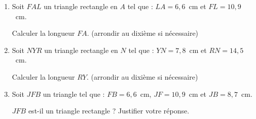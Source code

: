 \begin{minipage}{0.99\linewidth}

\exo


 

    \begin{enumerate}
    \item Soit $FAL$ un triangle rectangle en $A$ tel que :
    $LA=6,6$~cm et $FL=10,9$~cm.\par
      Calculer la longueur $FA$. (arrondir au dixième si nécessaire)

    \item Soit $NYR$ un triangle rectangle en $N$ tel que : 
    $YN=7,8$~cm et $RN=14,5$~cm.\par
      Calculer la longueur $RY$. (arrondir au dixième si nécessaire)

    \item Soit $JFB$ un triangle tel que :
      $FB=6,6$~cm, $JF=10,9$~cm et $JB=8,7$~cm.\par
      $JFB$ est-il un triangle rectangle ? Justifier votre réponse.
    \end{enumerate}

\end{minipage}

\vspace{0.5cm}
